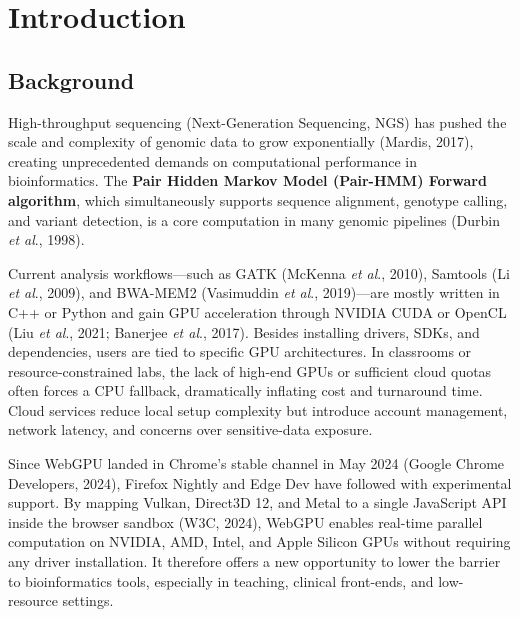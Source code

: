 \documentclass[PhD]{PHlab-thesis}
\begin{document}
\printnomenclature[5cm]

\newpage
\setcounter{page}{1}

\chapter{Introduction}
\section{Background}
High-throughput sequencing (Next-Generation Sequencing, NGS) has pushed the scale and complexity of genomic data to grow exponentially (Mardis, 2017), creating unprecedented demands on computational performance in bioinformatics. The \textbf{Pair Hidden Markov Model (Pair-HMM) Forward algorithm}, which simultaneously supports sequence alignment, genotype calling, and variant detection, is a core computation in many genomic pipelines (Durbin \emph{et al}., 1998).

Current analysis workflows—such as GATK (McKenna \emph{et al}., 2010), Samtools (Li \emph{et al}., 2009), and BWA-MEM2 (Vasimuddin \emph{et al}., 2019)—are mostly written in C++ or Python and gain GPU acceleration through NVIDIA CUDA or OpenCL (Liu \emph{et al}., 2021; Banerjee \emph{et al}., 2017). Besides installing drivers, SDKs, and dependencies, users are tied to specific GPU architectures. In classrooms or resource-constrained labs, the lack of high-end GPUs or sufficient cloud quotas often forces a CPU fallback, dramatically inflating cost and turnaround time. Cloud services reduce local setup complexity but introduce account management, network latency, and concerns over sensitive-data exposure.

Since WebGPU landed in Chrome's stable channel in May 2024 (Google Chrome Developers, 2024), Firefox Nightly and Edge Dev have followed with experimental support. By mapping Vulkan, Direct3D 12, and Metal to a single JavaScript API inside the browser sandbox (W3C, 2024), WebGPU enables real-time parallel computation on NVIDIA, AMD, Intel, and Apple Silicon GPUs without requiring any driver installation. It therefore offers a new opportunity to lower the barrier to bioinformatics tools, especially in teaching, clinical front-ends, and low-resource settings.
\end{document}
